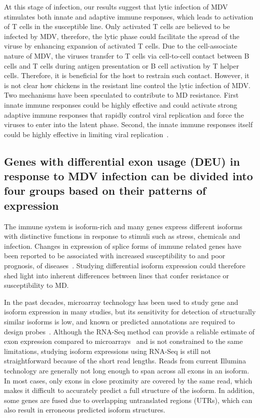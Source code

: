 At this stage of infection, our results suggest that lytic infection
of MDV stimulates both innate and adaptive immune responses, which
leads to activation of T cells in the susceptible line.  Only
activated T cells are believed to be infected by MDV, therefore, the
lytic phase could facilitate the spread of the viruse by enhancing
expansion of activated T cells.  Due to the cell-associate nature of
MDV, the viruses transfer to T cells via cell-to-cell contact between
B cells and T cells during antigen presentation or B cell activation
by T helper cells.  Therefore, it is beneficial for the host to
restrain such contact.  However, it is not clear how chickens in the
resistant line control the lytic infection of MDV.  Two mechanisms
have been speculated to contribute to MD resistance.  First innate
immune responses could be highly effective and could activate strong
adaptive immune responses that rapidly control viral replication and
force the viruses to enter into the latent phase.  Second, the innate
immune responses itself could be highly effective in limiting viral
replication~\cite{smith2011systems}.


\subsection{Genes with differential exon usage (DEU) in response
to MDV infection can be divided into four groups based on their
patterns of expression}

The immune system is isoform-rich and many genes express different
isoforms with distinctive functions in response to stimuli such as
stress, chemicals and infection.  Changes in expression of splice
forms of immune related genes have been reported to be associated with
increased susceptibility to and poor prognosis, of
diseases~\cite{lynch2004consequences}.  Studying differential isoform
expression could therefore shed light into inherent differences
between lines that confer resistance or susceptibility to MD.

In the past decades, microarray technology has been used to study gene
and isoform expression in many studies, but its sensitivity for
detection of structurally similar isoforms is low, and known or
predicted annotations are required to design
probes~\cite{kane2000assessment}.  Although the RNA-Seq method can
provide a reliable estimate of exon expression compared to
microarrays~\cite{pan2008deep} and is not constrained to the same
limitations, studying isoform expressions using RNA-Seq is still not
straightforward because of the short read lengths.  Reads from current
Illumina technology are generally not long enough to span across all
exons in an isoform.  In most cases, only exons in close proximity are
covered by the same read, which makes it difficult to accurately
predict a full structure of the isoform.  In addition, some genes are
fused due to overlapping untranslated regions (UTRs), which can also
result in erroneous predicted isoform structures.

